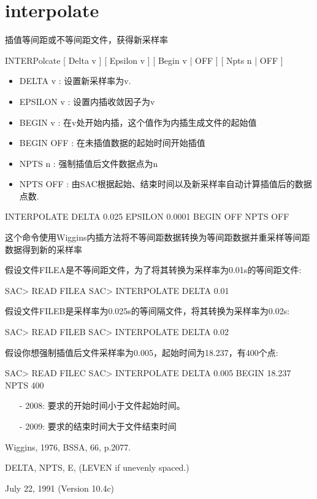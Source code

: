 \section{interpolate}
\label{cmd:interpolate}

插值等间距或不等间距文件，获得新采样率

INTERPolcate [ Delta v ] [ Epsilon v ] [ Begin v | OFF ] [ Npts n | OFF ]

\begin{itemize}
\item DELTA v : 设置新采样率为v.
\item EPSILON v : 设置内插收敛因子为v
\item BEGIN v :  在v处开始内插，这个值作为内插生成文件的起始值 
\item BEGIN OFF : 在未插值数据的起始时间开始插值 
\item NPTS n : 强制插值后文件数据点为n 
\item NPTS OFF : 由SAC根据起始、结束时间以及新采样率自动计算插值后的数据点数. 
\end{itemize}

INTERPOLATE DELTA 0.025 EPSILON 0.0001 BEGIN OFF NPTS OFF

这个命令使用Wiggins内插方法将不等间距数据转换为等间距数据并重采样等间距数据得到新的采样率

假设文件FILEA是不等间距文件，为了将其转换为采样率为0.01s的等间距文件:
\begin{SACCode}
SAC> READ FILEA
SAC> INTERPOLATE DELTA 0.01
\end{SACCode}

假设文件FILEB是采样率为0.025s的等间隔文件，将其转换为采样率为0.02s:
\begin{SACCode}
SAC> READ FILEB
SAC> INTERPOLATE DELTA 0.02
\end{SACCode}

假设你想强制插值后文件采样率为0.005，起始时间为18.237，有400个点:
\begin{SACCode}
SAC> READ FILEC
SAC> INTERPOLATE DELTA 0.005 BEGIN 18.237 NPTS 400
\end{SACCode}

\begin{itemize}
\item[-]2008: 要求的开始时间小于文件起始时间。
\item[-]2009: 要求的结束时间大于文件结束时间
\end{itemize}

Wiggins, 1976, BSSA, 66, p.2077.

DELTA, NPTS, E, (LEVEN if unevenly spaced.)

July 22, 1991 (Version 10.4c)
